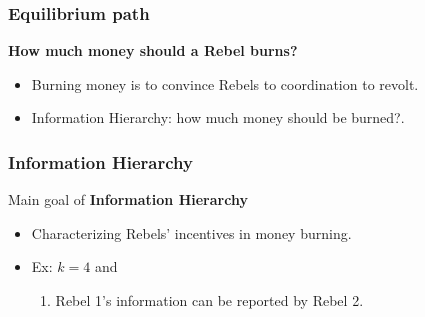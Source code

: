 \documentclass[10pt]{beamer}
\begin{document}
\begin{frame}
\frametitle{Equilibrium path}

\textbf{How much money should a Rebel burns?}

\begin{itemize}
\item Burning money is to convince Rebels to {coordination to revolt}.
\item \alert{Information Hierarchy}: how much money should be burned?.
\end{itemize}

\end{frame}


\begin{frame}
   \frametitle{Information Hierarchy}


Main goal of \textbf{Information Hierarchy}
\begin{itemize}
\item Characterizing Rebels' incentives in money burning.
\item Ex: $k=4$ and
\begin{center}
\end{center}

\begin{enumerate}
\item Rebel 1's information can be reported by Rebel 2.
\end{enumerate}

\end{itemize}



\end{frame}
\end{document}

